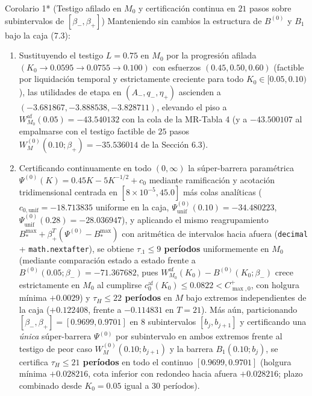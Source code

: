 \documentclass[11pt,letterpaper]{article}
\theoremstyle{plain}
\newtheorem*{namedthm}{\protect\namedthmname}
\newcommand{\namedthmname}{}
\newenvironment{thm_box}[1]{\renewcommand{\namedthmname}{#1}\begin{namedthm}}{\end{namedthm}}
\begin{document}
\begin{thm_box}{Corolario 1* (Testigo afilado en $M_0$ y certificación continua en $21$ pasos sobre subintervalos de $[\beta_-,\beta_+]$)}
Manteniendo sin cambios la estructura de $B^{(0)}$ y $B_1$ bajo la caja (7.3):
\begin{enumerate}
\item Sustituyendo el testigo $L=0.75$ en $M_0$ por la progresión afilada $(K_0\to 0.0595\to 0.0755\to 0.100)$ con esfuerzos $(0.45,0.50,0.60)$ (factible por liquidación temporal y estrictamente creciente para todo $K_0\in[0.05,0.10)$), las utilidades de etapa en $(A_-,q_-,\eta_+)$ ascienden a $(-3.681867, -3.888538, -3.828711)$, elevando el piso a $W_{M_0}^{\mathrm{af}}(0.05) = -43.540132$ con la cola de la MR-Tabla 4 (y a $-43.500107$ al empalmarse con el testigo factible de $25$ pasos $W_M^{(0)}(0.10;\beta_+)=-35.536014$ de la Sección 6.3).
\item Certificando continuamente en todo $(0,\infty)$ la súper-barrera paramétrica $\Psi^{(0)}(K) = 0.45K - 5K^{-1/2} + c_0$ mediante ramificación y acotación tridimensional centrada en $[8\times 10^{-5}, 45.0]$ más colas analíticas ($c_{0,\mathrm{unif}} = -18.713835$ uniforme en la caja, $\Psi^{(0)}_{\mathrm{unif}}(0.10) = -34.480223$, $\Psi^{(0)}_{\mathrm{unif}}(0.28) = -28.036947$), y aplicando el mismo reagrupamiento $B_*^{\max} + \beta_+^T(\Psi^{(0)}-B_*^{\max})$ con aritmética de intervalos hacia afuera (\texttt{decimal} + \texttt{math.nextafter}), se obtiene \textbf{$\tau_{.1}\le 9$ períodos} uniformemente en $M_0$ (mediante comparación estado a estado frente a $B^{(0)}(0.05;\beta_-)=-71.367682$, pues $W_{M_0}^{\mathrm{af}}(K_0)-B^{(0)}(K_0;\beta_-)$ crece estrictamente en $M_0$ al cumplirse $c_0^{\mathrm{af}}(K_0)\le 0.0822<C_{\max,0}^+$, con holgura mínima $+0.0029$) y \textbf{$\tau_H\le 22$ períodos} en $M$ bajo extremos independientes de la caja ($+0.122408$, frente a $-0.114831$ en $T=21$). Más aún, particionando $[\beta_-,\beta_+]=[0.9699,0.9701]$ en $8$ subintervalos $[b_j,b_{j+1}]$ y certificando una \emph{única} súper-barrera $\Psi^{(0)}$ por subintervalo en ambos extremos frente al testigo de peor caso $W_M^{(0)}(0.10;b_{j+1})$ y la barrera $B_1(0.10;b_j)$, se certifica \textbf{$\tau_H\le 21$ períodos} en todo el continuo $[0.9699,0.9701]$ (holgura mínima $+0.028216$, cota inferior con redondeo hacia afuera $+0.028216$; plazo combinado desde $K_0=0.05$ igual a $30$ períodos).
\end{enumerate}
\end{thm_box}
\end{document}
